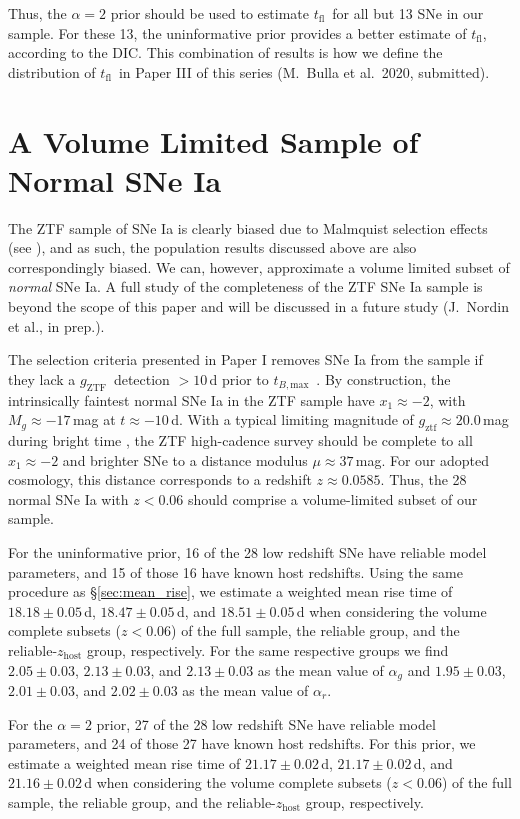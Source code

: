 \documentclass[twocolumn]{./aastex63}
\newcommand{\gztf}{$g_\mathrm{ZTF}$}
\newcommand{\tfl}{$t_\mathrm{fl}$}
\newcommand{\tbmax}{$t_{B,\mathrm{max}}$}
\begin{document}
Thus, the $\alpha = 2$ prior should be used to estimate \tfl\ for all but 13
SNe in our sample. For these 13, the uninformative prior provides a better
estimate of \tfl, according to the DIC. This combination of results is how we
define the distribution of \tfl\ in Paper III of this series (M.~Bulla et
al.~2020, submitted).

\section{A Volume Limited Sample of Normal SNe Ia}\label{sec:volume_limited}

The ZTF sample of SNe Ia is clearly biased due to Malmquist selection effects
(see \citealt{Yao19}), and as such, the population results discussed above are
also correspondingly biased. We can, however, approximate a volume limited
subset of \textit{normal} SNe Ia. A full study of the completeness of the ZTF
SNe Ia sample is beyond the scope of this paper and will be discussed in a
future study (J.~Nordin et al., in prep.).

The selection criteria presented in Paper I removes SNe Ia from the sample if
they lack a \gztf\ detection $> 10$\,d prior to \tbmax\ \citep{Yao19}. By
construction, the intrinsically faintest normal SNe Ia in the ZTF sample have
$x_1 \approx -2$, with $M_g \approx -17$\,mag at $t \approx -10$\,d. With a
typical limiting magnitude of $g_\mathrm{ztf} \approx 20.0$\,mag during bright
time \citep{Bellm19}, the ZTF high-cadence survey should be complete to all
$x_1 \approx -2$ and brighter SNe to a distance modulus $\mu \approx 37$\,mag.
For our adopted cosmology, this distance corresponds to a redshift $z \approx
0.0585$. Thus, the 28 normal SNe Ia with $z < 0.06$ should comprise a
volume-limited subset of our sample.

For the uninformative prior, 16 of the 28 low redshift SNe have reliable model
parameters, and 15 of those 16 have known host redshifts. Using the same
procedure as \S\ref{sec:mean_rise}, we estimate a weighted mean rise time of
$18.18 \pm 0.05$\,d, $18.47 \pm 0.05$\,d, and $18.51 \pm 0.05$\,d when
considering the volume complete subsets ($z < 0.06$) of the full sample, the
reliable group, and the reliable-$z_\mathrm{host}$ group, respectively. For
the same respective groups we find $2.05 \pm 0.03$, $2.13 \pm 0.03$, and $2.13
\pm 0.03$ as the mean value of $\alpha_g$ and $1.95 \pm 0.03$, $2.01 \pm
0.03$, and $2.02 \pm 0.03$ as the mean value of $\alpha_r$.

For the $\alpha = 2$ prior, 27 of the 28 low redshift SNe have reliable model
parameters, and 24 of those 27 have known host redshifts. For this prior, we
estimate a weighted mean rise time of $21.17 \pm 0.02$\,d, $21.17 \pm 0.02$\,d,
and $21.16 \pm 0.02$\,d when considering the volume complete subsets ($z <
0.06$) of the full sample, the reliable group, and the
reliable-$z_\mathrm{host}$ group, respectively.
\end{document}
